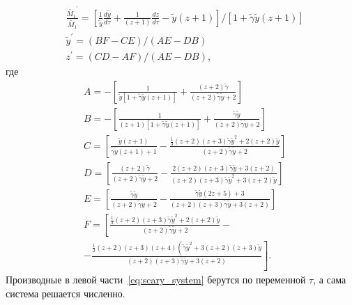 \begin{equation} \label{eq:scary_system}
	\begin{aligned}
		&\frac{\tilde{M_1}^{\prime}}{\tilde{M_1}}=\left[\frac{1}{\tilde{y}} \frac{d \tilde{y}}{d \tau}+\frac{1}{(z+1)} \frac{d z}{d \tau}-\tilde{y}(z+1)\right] /[1+\tilde{\gamma} \tilde{y}(z+1)] \\
		&\tilde{y}^{\prime}=(B F-C E) /(A E-D B) \\
		&z^{\prime}=(C D-A F) /(A E-D B),
	\end{aligned}
\end{equation}
где
\begin{equation}
	\begin{aligned}
		&A=-\left[\frac{1}{\tilde{y}[1+\tilde{\gamma} \tilde{y}(z+1)]}+\frac{(z+2) \tilde{\gamma}}{(z+2) \tilde{\gamma} \tilde{y}+2}\right] \\
		&B=-\left[\frac{1}{(z+1)[1+\tilde{\gamma} \tilde{y}(z+1)]}+\frac{\tilde{\gamma} \tilde{y}}{(z+2) \tilde{\gamma} \tilde{y}+2}\right] \\
		&C=\left[\frac{\tilde{y}(z+1)}{\tilde{\gamma} \tilde{y}(z+1)+1}-\frac{\frac{1}{3}(z+2)(z+3) \tilde{\gamma} \tilde{y}^2+2(z+2) \tilde{y}}{(z+2) \tilde{\gamma} \tilde{y}+2}\right] \\
		&D=\left[\frac{(z+2) \tilde{\gamma}}{(z+2) \tilde{\gamma} \tilde{y}+2}-\frac{2(z+2)(z+3) \tilde{\gamma} \tilde{y}+3(z+2)}{(z+2)(z+3) \tilde{\gamma} \tilde{y}^2+3(z+2) \tilde{y}}\right] \\
		&E=\left[\frac{\tilde{\gamma} \tilde{y}}{(z+2) \tilde{\gamma} y+2}-\frac{\tilde{\gamma} \tilde{y}(2 z+5)+3}{(z+2)(z+3) \tilde{\gamma} \tilde{y}+3(z+2)}\right] \\
		&F=\left[\frac{\frac{1}{3}(z+2)(z+3) \tilde{\gamma} \tilde{y}^2+2(z+2) \tilde{y}}{(z+2) \tilde{\gamma} \tilde{y}+2}-\right. \\
		&\left.-\frac{\frac{1}{2}(z+2)(z+3)(z+4)\left(\tilde{\gamma} \tilde{y}^2+3(z+2)(z+3) \tilde{y}\right.}{(z+2)(z+3) \tilde{\gamma} \tilde{y}+3(z+2)}\right].
	\end{aligned}
\end{equation}
Производные в левой части~\ref{eq:scary_system} берутся по переменной $\tau$, а сама система решается численно.